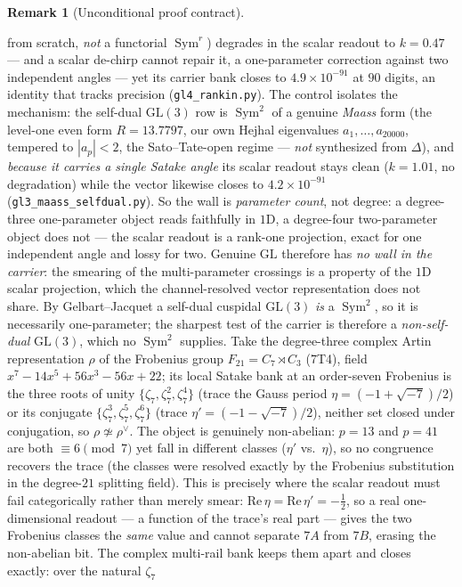 \documentclass[11pt]{article}
\theoremstyle{definition}
\newtheorem{remark}[theorem]{Remark}
\newcommand{\Sym}{\operatorname{Sym}}
\begin{document}
\begin{remark}[Unconditional proof contract]
\begin{enumerate}
from scratch, \emph{not} a functorial $\Sym^r$) degrades in the scalar readout to $k=0.47$ --- and a scalar
de-chirp cannot repair it, a one-parameter correction against two independent angles --- yet its carrier bank
closes to $4.9\times10^{-91}$ at $90$ digits, an identity that tracks precision (\texttt{gl4\_rankin.py}). The
control isolates the mechanism: the self-dual $\mathrm{GL}(3)$ row is $\Sym^2$ of a genuine \emph{Maass} form
(the level-one even form $R=13.7797$, our own Hejhal eigenvalues $a_1,\dots,a_{20000}$, tempered to $|a_p|<2$,
the Sato--Tate-open regime --- \emph{not} synthesized from $\Delta$), and \emph{because it carries a single
Satake angle} its scalar readout stays clean ($k=1.01$, no degradation) while the vector likewise closes to
$4.2\times10^{-91}$ (\texttt{gl3\_maass\_selfdual.py}). So the wall is \emph{parameter count}, not degree: a
degree-three one-parameter object reads faithfully in $1$D, a degree-four two-parameter object does not --- the
scalar readout is a rank-one projection, exact for one independent angle and lossy for two. Genuine
$\mathrm{GL}$ therefore has \emph{no wall in the carrier}: the smearing of the multi-parameter crossings is a
property of the $1$D scalar projection, which the channel-resolved vector representation does not share.
By Gelbart--Jacquet a self-dual cuspidal $\mathrm{GL}(3)$ \emph{is} a $\Sym^2$, so it is necessarily
one-parameter; the sharpest test of the carrier is therefore a \emph{non-self-dual} $\mathrm{GL}(3)$, which no
$\Sym^2$ supplies. Take the degree-three complex Artin representation $\rho$ of the Frobenius group
$F_{21}=C_7\rtimes C_3$ (7T4), field $x^7-14x^5+56x^3-56x+22$; its local Satake bank at an order-seven
Frobenius is the three roots of unity $\{\zeta_7,\zeta_7^2,\zeta_7^4\}$ (trace the Gauss period
$\eta=(-1+\sqrt{-7})/2$) or its conjugate $\{\zeta_7^3,\zeta_7^5,\zeta_7^6\}$ (trace $\eta'=(-1-\sqrt{-7})/2$),
neither set closed under conjugation, so $\rho\not\simeq\rho^\vee$. The object is genuinely non-abelian:
$p=13$ and $p=41$ are both $\equiv6\pmod7$ yet fall in different classes ($\eta'$ vs.\ $\eta$), so no congruence
recovers the trace (the classes were resolved exactly by the Frobenius substitution in the degree-$21$ splitting
field). This is precisely where the scalar readout must fail categorically rather than merely smear:
$\mathrm{Re}\,\eta=\mathrm{Re}\,\eta'=-\tfrac12$, so a real one-dimensional readout --- a function of the trace's
real part --- gives the two Frobenius classes the \emph{same} value and cannot separate $7A$ from $7B$, erasing
the non-abelian bit. The complex multi-rail bank keeps them apart and closes exactly: over the natural $\zeta_7$

\end{enumerate}
\end{remark}
\end{document}
